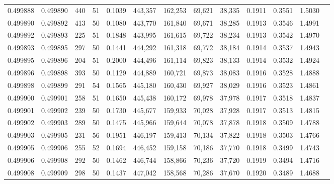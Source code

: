 \begin{tabular}{rrrrrrrrrrrrr}
0.499888 & 0.499890 & 440 &  51 &                                     0.1039 & 443,357 & 162,253 &  69,621 &  38,335 & 0.1911 & 0.3551 & 1.5030 \\
0.499890 & 0.499892 & 413 &  50 &                                     0.1080 & 443,770 & 161,840 &  69,671 &  38,285 & 0.1913 & 0.3546 & 1.4991 \\
0.499892 & 0.499893 & 225 &  51 &                                     0.1848 & 443,995 & 161,615 &  69,722 &  38,234 & 0.1913 & 0.3542 & 1.4970 \\
0.499893 & 0.499895 & 297 &  50 &                                     0.1441 & 444,292 & 161,318 &  69,772 &  38,184 & 0.1914 & 0.3537 & 1.4943 \\
0.499895 & 0.499896 & 204 &  51 &                                     0.2000 & 444,496 & 161,114 &  69,823 &  38,133 & 0.1914 & 0.3532 & 1.4924 \\
0.499896 & 0.499898 & 393 &  50 &                                     0.1129 & 444,889 & 160,721 &  69,873 &  38,083 & 0.1916 & 0.3528 & 1.4888 \\
0.499898 & 0.499899 & 291 &  54 &                                     0.1565 & 445,180 & 160,430 &  69,927 &  38,029 & 0.1916 & 0.3523 & 1.4861 \\
0.499900 & 0.499901 & 258 &  51 &                                     0.1650 & 445,438 & 160,172 &  69,978 &  37,978 & 0.1917 & 0.3518 & 1.4837 \\
0.499901 & 0.499902 & 239 &  50 &                                     0.1730 & 445,677 & 159,933 &  70,028 &  37,928 & 0.1917 & 0.3513 & 1.4815 \\
0.499902 & 0.499903 & 289 &  50 &                                     0.1475 & 445,966 & 159,644 &  70,078 &  37,878 & 0.1918 & 0.3509 & 1.4788 \\
0.499903 & 0.499905 & 231 &  56 &                                     0.1951 & 446,197 & 159,413 &  70,134 &  37,822 & 0.1918 & 0.3503 & 1.4766 \\
0.499905 & 0.499906 & 255 &  52 &                                     0.1694 & 446,452 & 159,158 &  70,186 &  37,770 & 0.1918 & 0.3499 & 1.4743 \\
0.499906 & 0.499908 & 292 &  50 &                                     0.1462 & 446,744 & 158,866 &  70,236 &  37,720 & 0.1919 & 0.3494 & 1.4716 \\
0.499908 & 0.499909 & 298 &  50 &                                     0.1437 & 447,042 & 158,568 &  70,286 &  37,670 & 0.1920 & 0.3489 & 1.4688 \\

\end{tabular}
